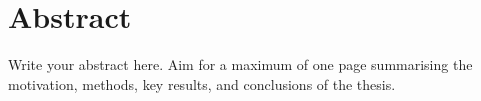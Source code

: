
\chapter*{Abstract}

Write your abstract here. Aim for a maximum of one page summarising the
motivation, methods, key results, and conclusions of the thesis.

